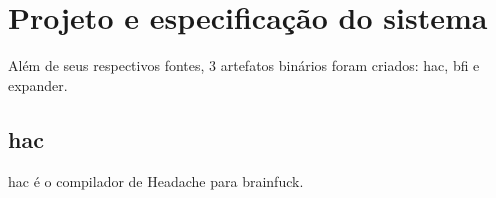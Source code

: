 %
%
% 
%

\chapter{Projeto e especificação do sistema}
\noindent

Além de seus respectivos fontes, 3 artefatos binários foram criados: hac, bfi e expander. 

\section{hac}

hac é o compilador de Headache para brainfuck. 

